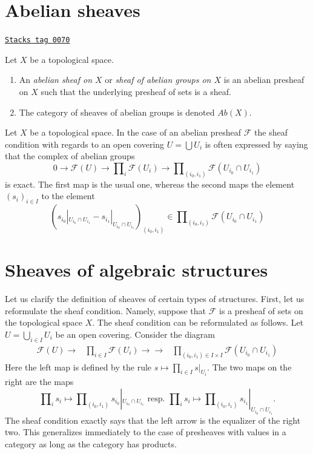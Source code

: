 \section{Abelian sheaves}
\label{sheaves-section-abelian-sheaves}
\begin{definition}
\label{sheaves-definition-abelian-sheaf}
\href{https://stacks.math.columbia.edu/tag/0070}{\texttt{Stacks tag 0070}}

Let $X$ be a topological space.
\begin{enumerate}
\item An {\it abelian sheaf on $X$} or
{\it sheaf of abelian groups on $X$}
is an abelian presheaf on $X$ such that the underlying presheaf of
sets is a sheaf.
\item The category of sheaves of abelian groups
is denoted $\textit{Ab}(X)$.
\end{enumerate}
\end{definition}

Let $X$ be a topological space.
In the case of an abelian presheaf $\mathcal{F}$ the sheaf
condition with regards to an open covering $U = \bigcup U_i$
is often expressed by saying that the complex of abelian groups
$$
0 \to \mathcal{F}(U)
\to \prod\nolimits_i \mathcal{F}(U_i)
\to \prod\nolimits_{(i_0, i_1)} \mathcal{F}(U_{i_0} \cap U_{i_1})
$$
is exact. The first map is the usual one, whereas the second
maps the element $(s_i)_{i \in I}$ to the element
$$
(
s_{i_0}|_{U_{i_0} \cap U_{i_1}} -
s_{i_1}|_{U_{i_0} \cap U_{i_1}}
)_{(i_0, i_1)}
\in \prod\nolimits_{(i_0, i_1)} \mathcal{F}(U_{i_0} \cap U_{i_1})
$$

\section{Sheaves of algebraic structures}
\label{sheaves-section-sheaves-structures}
Let us clarify the definition of sheaves of certain types of structures.
First, let us reformulate the sheaf condition. Namely, suppose that
$\mathcal{F}$ is a presheaf of sets on the topological space $X$.
The sheaf condition can be reformulated as follows. Let
$U = \bigcup_{i\in I} U_i$ be an open covering. Consider the
diagram
$$
\begin{array}{ccc}\mathcal{F}(U) \longrightarrow & \prod\nolimits_{i\in I}
\mathcal{F}(U_i)
\longrightarrow\longrightarrow & \prod\nolimits_{(i_0, i_1) \in I \times I}
\mathcal{F}(U_{i_0} \cap U_{i_1})\end{array}
$$
Here the left map is defined by the rule
$s \mapsto \prod_{i \in I} s|_{U_i}$. The two maps
on the right are the maps
$$
\prod\nolimits_i s_i
\mapsto
\prod\nolimits_{(i_0, i_1)} s_{i_0}|_{U_{i_0} \cap U_{i_1}}
\text{ resp. }
\prod\nolimits_i s_i
\mapsto
\prod\nolimits_{(i_0, i_1)} s_{i_1}|_{U_{i_0} \cap U_{i_1}}.
$$
The sheaf condition exactly says that the left arrow
is the equalizer of the right two. This generalizes
immediately to the case of presheaves with values in a
category as long as the category has products.


